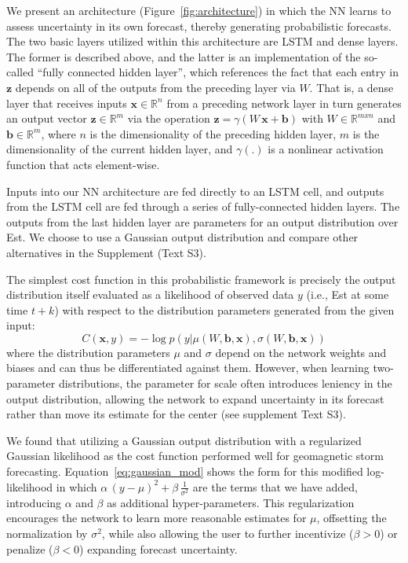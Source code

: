 We present an architecture (Figure~\ref{fig:architecture}) in which the NN learns to assess uncertainty in its own forecast, thereby generating probabilistic forecasts. The two basic layers utilized within this architecture are LSTM and dense layers. The former is described above, and the latter is an implementation of the so-called ``fully connected hidden layer'', which references the fact that each entry in $\mathbf{z}$ depends on all of the outputs from the preceding layer via $W$. That is, a dense layer that receives inputs $\mathbf{x} \in \mathbb{R}^n$ from a preceding network layer in turn generates an output vector $\mathbf{z} \in \mathbb{R}^m$ via the operation $\mathbf{z} = \gamma(W\,\mathbf{x} + \mathbf{b})$ with $W \in \mathbb{R}^{mxn}$ and $\mathbf{b} \in \mathbb{R}^m$, where $n$ is the dimensionality of the preceding hidden layer, $m$ is the dimensionality of the current hidden layer, and $\gamma(.)$ is a nonlinear activation function that acts element-wise. 

Inputs into our NN architecture are fed directly to an LSTM cell, and outputs from the LSTM cell are fed through a series of fully-connected hidden layers. The outputs from the last hidden layer are parameters for an output distribution over Est. We choose to use a Gaussian output distribution and compare other alternatives in the Supplement (Text S3). 

The simplest cost function in this probabilistic framework is precisely the output distribution itself evaluated as a likelihood of observed data $y$ (i.e., Est at some time $t+k$) with respect to the distribution parameters generated from the given input:
\begin{equation}
C(\mathbf{x}, y) = -\log p\left( y \vert \mu(W, \mathbf{b}, \mathbf{x}), \sigma(W, \mathbf{b}, \mathbf{x})\right) \label{eq:output}
\end{equation}
where the distribution parameters $\mu$ and $\sigma$ depend on the network weights and biases and can thus be differentiated against them. However, when learning two-parameter distributions, the parameter for scale often introduces leniency in the output distribution, allowing the network to expand uncertainty in its forecast rather than move its estimate for the center (see supplement Text S3). 

We found that utilizing a Gaussian output distribution with a regularized Gaussian likelihood as the cost function performed well for geomagnetic storm forecasting. Equation~\ref{eq:gaussian_mod} shows the form for this modified log-likelihood in which $\alpha\,(y-\mu)^2 + \beta\,\frac{1}{\sigma^2}$ are the terms that we have added, introducing $\alpha$ and $\beta$ as additional hyper-parameters. This regularization encourages the network to learn more reasonable estimates for $\mu$, offsetting the normalization by $\sigma^2$, while also allowing the user to further incentivize ($\beta > 0$) or penalize ($\beta < 0$) expanding forecast uncertainty.

